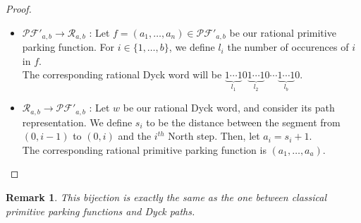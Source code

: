 \documentclass[12pt]{report}
\newtheorem*{rem}{Remark}
\begin{document}
\begin{proof}
    ~\
\begin{itemize}
    \item $\mathcal{PF'}_{a,b} \to \mathcal{R}_{a,b}$ :
    Let $f = (a_1, \ldots, a_n) \in \mathcal{PF'}_{a,b}$
    be our rational primitive parking function.
    For $i \in \{1, \ldots, b\}$, we define $l_i$ the
    number of occurences of $i$ in $f$.\\
    The corresponding rational Dyck word will be
    $\underbrace{1 \cdots 1}_{l_1}0
     \underbrace{1 \cdots 1}_{l_2}0 \cdots
     \underbrace{1 \cdots 1}_{l_b}0$.
    
    \item $\mathcal{R}_{a,b} \to \mathcal{PF'}_{a,b}$ :
    Let $w$ be our rational Dyck word, and consider its path
    representation. We define $s_i$ to be the distance
    between the segment from $(0, i - 1)$ to $(0, i)$
    and the $i^{th}$ North step. Then, let $a_i = s_i + 1$.\\
    The corresponding rational primitive parking function is 
    $(a_1, \ldots, a_a)$.
\end{itemize}
\end{proof}

\begin{rem}
    This bijection is exactly the same as the one between
    classical primitive parking functions and Dyck paths.
\end{rem}
\end{document}
